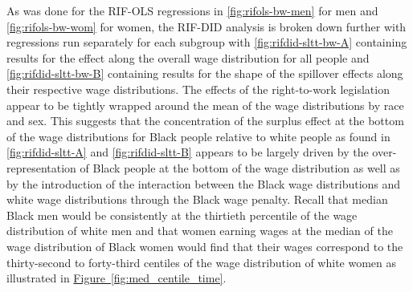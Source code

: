 \documentclass[11pt]{article}
\begin{document}
As was done for the RIF-OLS regressions in \autoref{fig:rifols-bw-men} for men and \autoref{fig:rifols-bw-wom} for women, the RIF-DID analysis is broken down further with regressions run separately for each subgroup with \autoref{fig:rifdid-sltt-bw-A} containing results for the effect along the overall wage distribution for all people and \autoref{fig:rifdid-sltt-bw-B} containing results for the shape of the spillover effects along their respective wage distributions. The effects of the right-to-work legislation appear to be tightly wrapped around the mean of the wage distributions by race and sex. This suggests that the concentration of the surplus effect at the bottom of the wage distributions for Black people relative to white people as found in \autoref{fig:rifdid-sltt-A} and \autoref{fig:rifdid-sltt-B} appears to be largely driven by the over-representation of Black people at the bottom of the wage distribution as well as by the introduction of the interaction between the Black wage distributions and white wage distributions through the Black wage penalty. Recall that median Black men would be consistently at the thirtieth percentile of the wage distribution of white men and that women earning wages at the median of the wage distribution of Black women would find that their wages correspond to the thirty-second to forty-third centiles of the wage distribution of white women as illustrated in  \hyperref[fig:med_centile_time]{Figure~\ref*{fig:med_centile_time}}.

\end{document}

